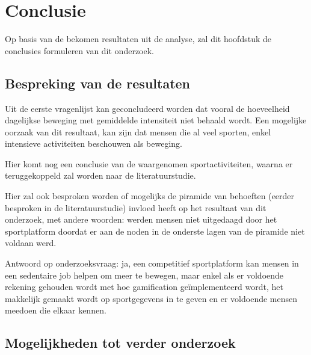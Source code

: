 
\chapter{Conclusie}%
\label{ch:conclusie}

Op basis van de bekomen resultaten uit de analyse, zal dit hoofdstuk de conclusies formuleren van dit onderzoek.


\section{Bespreking van de resultaten}

Uit de eerste vragenlijst kan geconcludeerd worden dat vooral de hoeveelheid dagelijkse beweging met gemiddelde intensiteit niet behaald wordt. Een mogelijke oorzaak van dit resultaat, kan zijn dat mensen die al veel sporten, enkel intensieve activiteiten beschouwen als beweging.

Hier komt nog een conclusie van de waargenomen sportactiviteiten, waarna er teruggekoppeld zal worden naar de literatuurstudie.

Hier zal ook besproken worden of mogelijks de piramide van behoeften (eerder besproken in de literatuurstudie) invloed heeft op het resultaat van dit onderzoek, met andere woorden: werden mensen niet uitgedaagd door het sportplatform doordat er aan de noden in de onderste lagen van de piramide niet voldaan werd.

Antwoord op onderzoeksvraag: ja, een competitief sportplatform kan mensen in een sedentaire job helpen om meer te bewegen, maar enkel als
er voldoende rekening gehouden wordt met hoe gamification geïmplementeerd wordt,
het makkelijk gemaakt wordt op sportgegevens in te geven en er voldoende mensen meedoen die elkaar kennen.

\section{Mogelijkheden tot verder onderzoek}

